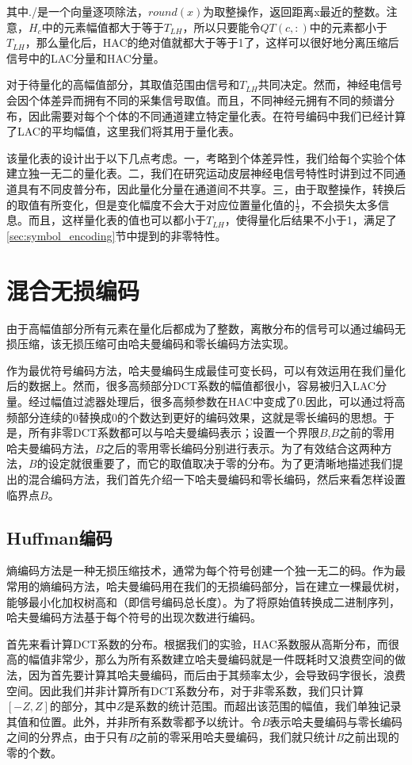 其中./是一个向量逐项除法，$round(x)$为取整操作，返回距离x最近的整数。注意，$H_c$中的元素幅值都大于等于$T_{LH}$，所以只要能令$ QT(c,:)$中的元素都小于$T_{LH}$，那么量化后，HAC的绝对值就都大于等于1了，这样可以很好地分离压缩后信号中的LAC分量和HAC分量。

对于待量化的高幅值部分，其取值范围由信号和$T_{LH}$共同决定。然而，神经电信号会因个体差异而拥有不同的采集信号取值\cite{33}。而且，不同神经元拥有不同的频谱分布，因此需要对每个个体的不同通道建立特定量化表。在符号编码中我们已经计算了LAC的平均幅值，这里我们将其用于量化表。

该量化表的设计出于以下几点考虑。一，考略到个体差异性，我们给每个实验个体建立独一无二的量化表。二，我们在研究运动皮层神经电信号特性时讲到过不同通道具有不同皮普分布，因此量化分量在通道间不共享。三，由于取整操作，转换后的取值有所变化，但是变化幅度不会大于对应位置量化值的$\frac{1}{2}$，不会损失太多信息。而且，这样量化表的值也可以都小于$T_{LH}$，使得量化后结果不小于1，满足了\ref{sec:symbol_encoding}节中提到的非零特性。



\section{混合无损编码}
由于高幅值部分所有元素在量化后都成为了整数，离散分布的信号可以通过编码无损压缩，该无损压缩可由哈夫曼编码和零长编码方法实现。

作为最优符号编码方法，哈夫曼编码生成最佳可变长码，可以有效运用在我们量化后的数据上。然而，很多高频部分DCT系数的幅值都很小，容易被归入LAC分量。经过幅值过滤器处理后，很多高频参数在HAC中变成了0.因此，可以通过将高频部分连续的0替换成0的个数达到更好的编码效果，这就是零长编码的思想。于是，所有非零DCT系数都可以与哈夫曼编码表示；设置一个界限$B$,$B$之前的零用哈夫曼编码方法，$B$之后的零用零长编码分别进行表示。为了有效结合这两种方法，$B$的设定就很重要了，而它的取值取决于零的分布。为了更清晰地描述我们提出的混合编码方法，我们首先介绍一下哈夫曼编码和零长编码，然后来看怎样设置临界点$B$。


\subsection{Huffman编码}
熵编码方法是一种无损压缩技术，通常为每个符号创建一个独一无二的码。作为最常用的熵编码方法，哈夫曼编码\cite{22}用在我们的无损编码部分，旨在建立一棵最优树，能够最小化加权树高和（即信号编码总长度）\cite{21}。为了将原始值转换成二进制序列，哈夫曼编码方法基于每个符号的出现次数进行编码。

首先来看计算DCT系数的分布。根据我们的实验，HAC系数服从高斯分布，而很高的幅值非常少，那么为所有系数建立哈夫曼编码就是一件既耗时又浪费空间的做法，因为首先要计算其哈夫曼编码，而后由于其频率太少，会导致码字很长，浪费空间。因此我们并非计算所有DCT系数分布，对于非零系数，我们只计算$[-Z,Z]$的部分，其中$Z$是系数的统计范围。而超出该范围的幅值，我们单独记录其值和位置。此外，并非所有系数零都予以统计。令\emph{B}表示哈夫曼编码与零长编码之间的分界点，由于只有\emph{B}之前的零采用哈夫曼编码，我们就只统计\emph{B}之前出现的零的个数。




